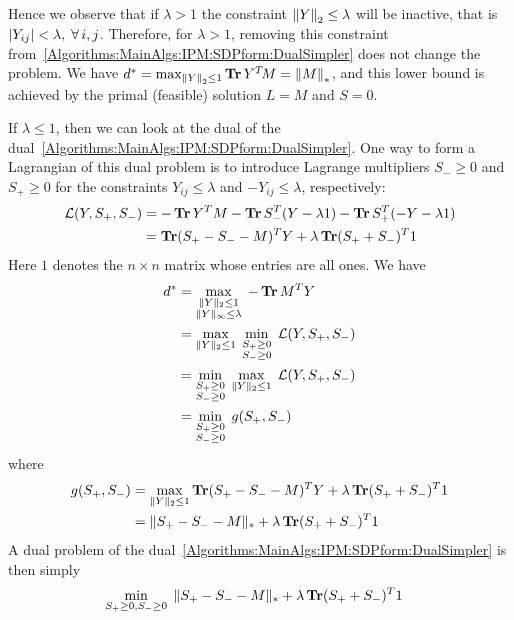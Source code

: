 \documentclass{../../common/projectreport}
\begin{document}
Hence we observe that if $\lambda >1$ the constraint ${\left\|Y\right\|}_{2}^{} \leq \lambda$ will be inactive, that is $|Y_{ij}|<\lambda,\;{\forall \,} i,j$. Therefore, for $\lambda > 1$, removing this constraint from~\eqref{Algorithms:MainAlgs:IPM:SDPform:DualSimpler} does not change the problem. We have $d^* = \max_{{\left\|Y\right\|}_{2}^{}\leq 1} \operatorname{\mathbf{Tr}} Y^T\!M = {\left\|M\right\|}_{*}^{}$, and this lower bound is achieved by the primal (feasible) solution $L=M$ and $S =0$.

If $\lambda \leq 1$, then we can look at the dual of the dual~\eqref{Algorithms:MainAlgs:IPM:SDPform:DualSimpler}. One way to form a Lagrangian of this dual problem is to introduce Lagrange multipliers $S_- \geq 0$ and $S_+ \geq 0$ for the constraints $Y_{ij} \leq \lambda$ and $-Y_{ij} \leq \lambda$, respectively:
\begin{align*}
\mathcal{L}(Y, S_+, S_-) 
&= -\operatorname{\mathbf{Tr}} Y^T M - \operatorname{\mathbf{Tr}} S_-^T(Y - \lambda 1) - \operatorname{\mathbf{Tr}} S_+^T(-Y - \lambda 1) \\
&= \operatorname{\mathbf{Tr}} (S_+ - S_- - M)^T Y + \lambda \operatorname{\mathbf{Tr}} (S_+ + S_-)^T 1
\end{align*}
Here $1$ denotes the $n \times n$ matrix whose entries are all ones. We have
\begin{align*}
d^*
&= \max_{\substack{\|Y\|_2 \leq 1 \\ \|Y\|_\infty \leq \lambda}}\; -\operatorname{\mathbf{Tr}} M^T Y\\
&= \max_{\|Y\|_2 \leq 1}\; \min_{\substack{S_+ \geq 0 \\ S_- \geq 0}}\; \mathcal{L}(Y, S_+, S_-) \\
&= \min_{\substack{S_+ \geq 0 \\ S_- \geq 0}}\; \max_{\|Y\|_2 \leq 1}\;  \mathcal{L}(Y, S_+, S_-) \\
&= \min_{\substack{S_+ \geq 0 \\ S_- \geq 0}}\; g(S_+, S_-)
\end{align*}
where 
\begin{align*}
g(S_+, S_-) 
&= \max_{\|Y\|_2 \leq 1} \operatorname{\mathbf{Tr}} (S_+ - S_- - M)^T Y + \lambda \operatorname{\mathbf{Tr}} (S_+ + S_-)^T 1 \\
&= \|S_+ - S_- - M\|_* + \lambda \operatorname{\mathbf{Tr}} (S_+ + S_-)^T 1
\end{align*}
A dual problem of the dual~\eqref{Algorithms:MainAlgs:IPM:SDPform:DualSimpler} is then simply
\begin{align}
&\min_{S_+\geq 0, S_-\geq 0}\; \|S_+ - S_- - M\|_* + \lambda \operatorname{\mathbf{Tr}} (S_+ + S_-)^T 1
\end{align}
\end{document}
